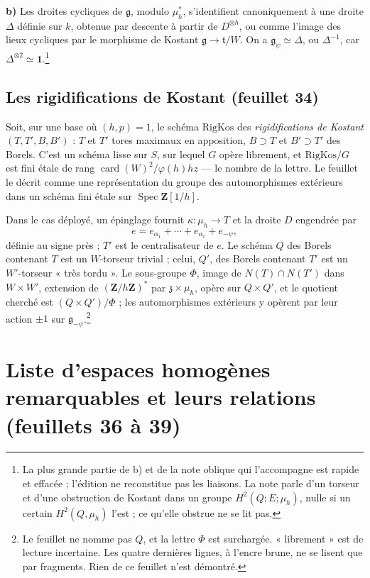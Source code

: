 \documentclass[11pt,a4paper]{article}
\begin{document}
\textbf{b)} Les droites cycliques de $\mathfrak{g}$, modulo $\mu_{h}^{*}$,
s'identifient canoniquement à une droite $\Delta$ définie sur $k$, obtenue par
descente à partir de $D^{\otimes h}$, ou comme l'image des lieux cycliques par
le morphisme de Kostant $\mathfrak{g}\to\mathfrak{t}/W$. On a
$\mathfrak{g}_{\psi}\simeq\Delta$, ou $\Delta^{-1}$, car
$\Delta^{\otimes 2}\simeq\mathbf{1}$.\footnote{La plus grande partie de b) et
de la note oblique qui l'accompagne est rapide et effacée ; l'édition ne
reconstitue pas les liaisons. La note parle d'un torseur et d'une obstruction
de Kostant dans un groupe $H^{2}(Q;E;\mu_{h})$, nulle si un certain
$H^{2}(Q,\mu_{h})$ l'est ; ce qu'elle obstrue ne se lit pas.}

\subsection*{Les rigidifications de Kostant (feuillet 34)}

Soit, sur une base où $(h,p)=1$, le schéma $\mathrm{RigKos}$ des
\emph{rigidifications de Kostant} $(T,T',B,B')$ : $T$ et $T'$ tores maximaux en
apposition, $B\supset T$ et $B'\supset T'$ des Borels. C'est un schéma lisse
sur $S$, sur lequel $G$ opère librement, et $\mathrm{RigKos}/G$ est fini étale
de rang $\operatorname{card}(W)^{2}/\varphi(h)hz$ — le nombre de la lettre.
Le feuillet le décrit comme une représentation du groupe des automorphismes
extérieurs dans un schéma fini étale sur $\operatorname{Spec}\mathbf{Z}[1/h]$.

Dans le cas déployé, un épinglage fournit $\kappa\colon\mu_{h}\to T$ et la
droite $D$ engendrée par
\[
  e=e_{\alpha_{1}}+\cdots+e_{\alpha_{r}}+e_{-\psi},
\]
définie au signe près ; $T'$ est le centralisateur de $e$. Le schéma $Q$ des
Borels contenant $T$ est un $W$-torseur trivial ; celui, $Q'$, des Borels
contenant $T'$ est un $W'$-torseur « très tordu ». Le sous-groupe
$\Phi$, image de $N(T)\cap N(T')$ dans $W\times W'$, extension de
$(\mathbf{Z}/h\mathbf{Z})^{*}$ par $\mathfrak{z}\times\mu_{h}$, opère sur
$Q\times Q'$, et le quotient cherché est $(Q\times Q')/\Phi$ ; les
automorphismes extérieurs y opèrent par leur action $\pm 1$ sur
$\mathfrak{g}_{-\psi}$.\footnote{Le feuillet ne nomme pas $Q$, et la lettre
$\Phi$ est surchargée. « librement » est de lecture incertaine. Les quatre
dernières lignes, à l'encre brune, ne se lisent que par fragments. Rien de ce
feuillet n'est démontré.}

\section*{Liste d'espaces homogènes remarquables et leurs relations (feuillets 36 à 39)}
\end{document}
